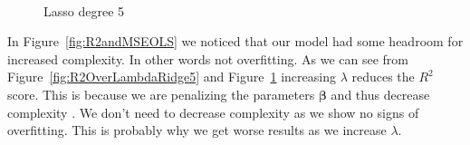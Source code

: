 \documentclass[twoside,11pt]{report}
\begin{document}
\begin{figure}[!h]
\begin{minipage}[!t]{.48\linewidth}
\begin{center}
        \caption{Lasso degree 5}\label{fig:R2OverLambdaLasso5}
    \end{center}
\end{minipage}\\
\end{figure}

In Figure~\ref{fig:R2andMSEOLS} we noticed that our model had some headroom for increased complexity. In
other words not overfitting. As we can see from Figure~\ref{fig:R2OverLambdaRidge5} and Figure~\ref{fig:R2OverLambdaLasso5}
increasing $\lambda$ reduces the $R^2$ score. This is because we are penalizing the parameters $\boldsymbol{\beta}$ and thus
decrease complexity . We don't need to decrease complexity as we show no signs of overfitting. 
This is probably why we get worse results as we increase $\lambda$.
\end{document}
